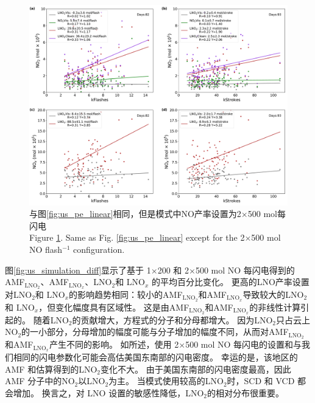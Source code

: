 \begin{figure}[htbp]
\centering
\includegraphics[width=15cm]{./figures/us_pe_linear_2x500.pdf}
\caption{与图\ref{fig:us_pe_linear}相同，但是模式中NO产率设置为2$\times$500 mol每闪电 \\Figure \ref{fig:us_pe_linear_2x500}. Same as Fig. \ref{fig:us_pe_linear} except for the 2$\times$500 mol NO flash$^{-1}$ configuration.}
\label{fig:us_pe_linear_2x500}
\end{figure}

图\ref{fig:us_simulation_diff}显示了基于 1$\times$200 和 2$\times$500 mol NO 每闪电得到的AMF$_\textrm{LNO$_2$}$、AMF$_\textrm{LNO$_x$}$、LNO$_2$和 LNO$_x$ 的平均百分比变化。
更高的LNO产率设置对LNO$_2$和 LNO$_x$的影响趋势相同：较小的AMF$_\textrm{LNO$_2$}$和AMF$_\textrm{LNO$_x$}$导致较大的LNO$_2$和 LNO$_x$，但变化幅度具有区域性。
这是由AMF$_\textrm{LNO$_2$}$和AMF$_\textrm{LNO$_x$}$的非线性计算引起的。
随着LNO$_2$的贡献增大，方程式的分子和分母都增大。
因为LNO$_2$只占云上NO$_2$的一小部分，分母增加的幅度可能与分子增加的幅度不同，从而对AMF$_\textrm{LNO$_2$}$和AMF$_\textrm{LNO$_x$}$产生不同的影响。
如\citet{Zhu.2019}所述，使用 2$\times$500 mol NO 每闪电的设置和与我们相同的闪电参数化可能会高估美国东南部的闪电密度。
幸运的是，该地区的 AMF 和估算得到的LNO$_2$变化不大。
由于美国东南部的闪电密度最高，因此 AMF 分子中的NO$_2$以LNO$_2$为主。
当模式使用较高的LNO$_2$时，SCD 和 VCD 都会增加。
换言之，对 LNO 设置的敏感性降低，LNO$_2$的相对分布很重要。

